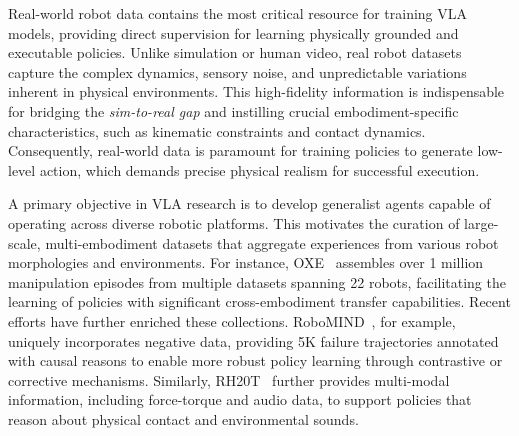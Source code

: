 \documentclass[10pt, a4paper, logo, copyright]{googledeepmind} %
\begin{document}
Real-world robot data contains the most critical resource for training VLA models, providing direct supervision for learning physically grounded and executable policies. Unlike simulation or human video, real robot datasets capture the complex dynamics, sensory noise, and unpredictable variations inherent in physical environments. This high-fidelity information is indispensable for bridging the \textit{sim-to-real gap} and instilling crucial embodiment-specific characteristics, such as kinematic constraints and contact dynamics. Consequently, real-world data is paramount for training policies to generate low-level action, which demands precise physical realism for successful execution.

A primary objective in VLA research is to develop generalist agents capable of operating across diverse robotic platforms. This motivates the curation of large-scale, multi-embodiment datasets that aggregate experiences from various robot morphologies and environments. For instance, OXE~\cite{RT-X} assembles over 1 million manipulation episodes from multiple datasets spanning 22 robots, facilitating the learning of policies with significant cross-embodiment transfer capabilities. Recent efforts have further enriched these collections. RoboMIND~\cite{wu2024robomind}, for example, uniquely incorporates negative data, providing 5K failure trajectories annotated with causal reasons to enable more robust policy learning through contrastive or corrective mechanisms. Similarly, RH20T~\cite{fang2023rh20t} further provides multi-modal information, including force-torque and audio data, to support policies that reason about physical contact and environmental sounds.
\end{document}
